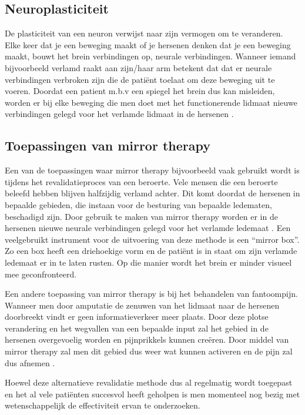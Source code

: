 \subsection{Neuroplasticiteit}
De plasticiteit van een neuron verwijst naar zijn vermogen om te veranderen. Elke keer dat je een beweging maakt of je hersenen denken dat je een beweging maakt, bouwt het brein verbindingen op, neurale verbindingen. Wanneer iemand bijvoorbeeld verlamd raakt aan zijn/haar arm betekent dat dat er neurale verbindingen verbroken zijn die de patiënt toelaat om deze beweging uit te voeren. Doordat een patient m.b.v een spiegel het brein dus kan misleiden, worden er bij elke beweging die men doet met het functionerende lidmaat nieuwe verbindingen gelegd voor het verlamde lidmaat in de hersenen \autocite{Saebo2018}.

\subsection{Toepassingen van mirror therapy}
Een van de toepassingen waar mirror therapy bijvoorbeeld vaak gebruikt wordt is tijdens het revalidatieproces van een beroerte.  Vele mensen die een beroerte beleefd hebben blijven halfzijdig verlamd achter. Dit komt doordat de hersenen in bepaalde gebieden, die instaan voor de besturing van bepaalde ledematen, beschadigd zijn. Door gebruik te maken van mirror therapy worden er in de hersenen nieuwe neurale verbindingen gelegd voor het verlamde ledemaat \autocite{Rehab2018}. Een veelgebruikt instrument voor de uitvoering van deze methode is een “mirror box”. Zo een box heeft een driehoekige vorm en de patiënt is in staat om zijn verlamde ledemaat er in te laten rusten. Op die manier wordt het brein er minder visueel mee geconfronteerd.

Een andere toepassing van mirror therapy is bij het behandelen van fantoompijn. Wanneer men door amputatie de zenuwen van het lidmaat naar de hersenen doorbreekt vindt er geen informatieverkeer meer plaats. Door deze plotse verandering en het wegvallen van een bepaalde input zal het gebied in de hersenen overgevoelig worden en pijnprikkels kunnen creëren. Door middel van mirror therapy zal men dit gebied dus weer wat kunnen activeren en de pijn zal dus afnemen \autocite{Veenstra2019}.

Hoewel deze alternatieve revalidatie methode dus al regelmatig wordt toegepast en het al vele patiënten succesvol heeft geholpen is men momenteel nog bezig met wetenschappelijk de effectiviteit ervan te onderzoeken.

